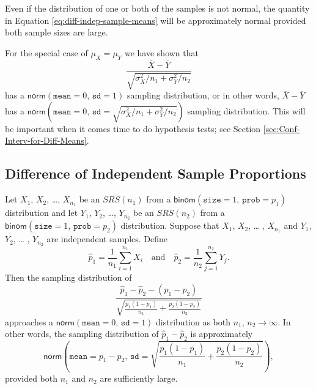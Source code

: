\documentclass[captions=tableheading]{scrbook}
\begin{document}
\begin{rem}
Even if the distribution of one or both of the samples is not normal, the quantity in Equation \ref{eq:diff-indep-sample-means} will be approximately normal provided both sample sizes are large.
\end{rem}

\begin{rem}
For the special case of \(\mu_{X}=\mu_{Y}\) we have shown that 
\begin{equation} \frac{\overline{X}-\overline{Y}}{\sqrt{\sigma_{X}^{2}/n_{1}+\sigma_{Y}^{2}/n_{2}}}
\end{equation}
has a \(\mathsf{norm}(\mathtt{mean}=0,\,\mathtt{sd}=1)\) sampling distribution, or in other words, \(\overline{X}-\overline{Y}\) has a \(\mathsf{norm}(\mathtt{mean}=0,\,\mathtt{sd}=\sqrt{\sigma_{X}^{2}/n_{1}+\sigma_{Y}^{2}/n_{2}})\) sampling distribution. This will be important when it comes time to do hypothesis tests; see Section \ref{sec:Conf-Interv-for-Diff-Means}.
\end{rem}
\subsection{Difference of Independent Sample Proportions}
\label{sec-8-4-2}

\begin{prop}
Let \(X_{1}\), \(X_{2}\), \ldots{}, \(X_{n_{1}}\) be an \(SRS(n_{1})\) from a \(\mathsf{binom}(\mathtt{size}=1,\,\mathtt{prob}=p_{1})\) distribution and let \(Y_{1}\), \(Y_{2}\), \ldots{}, \(Y_{n_{2}}\) be an \(SRS(n_{2})\) from a \(\mathsf{binom}(\mathtt{size}=1,\,\mathtt{prob}=p_{2})\) distribution. Suppose that \(X_{1}\), \(X_{2}\), \ldots{} , \(X_{n_{1}}\) and \(Y_{1}\), \(Y_{2}\), \ldots{} , \(Y_{n_{2}}\) are independent samples. Define 
\begin{equation}
\hat{p}_{1}=\frac{1}{n_{1}}\sum_{i=1}^{n_{1}}X_{i}\quad\mbox{and}\quad\hat{p}_{2}=\frac{1}{n_{2}}\sum_{j=1}^{n_{2}}Y_{j}.
\end{equation}
Then the sampling distribution of
\begin{equation}
\frac{\hat{p}_{1}-\hat{p}_{2}-(p_{1}-p_{2})}{\sqrt{\frac{p_{1}(1-p_{1})}{n_{1}}+\frac{p_{2}(1-p_{2})}{n_{2}}}}
\end{equation}
approaches a \(\mathsf{norm}(\mathtt{mean}=0,\,\mathtt{sd}=1)\) distribution as both \(n_{1},\, n_{2}\to\infty\). In other words, the sampling distribution of \(\hat{p}_{1}-\hat{p}_{2}\) is approximately
\begin{equation}
\mathsf{norm}\left(\mathtt{mean}=p_{1}-p_{2},\,\mathtt{sd}=\sqrt{\frac{p_{1}(1-p_{1})}{n_{1}}+\frac{p_{2}(1-p_{2})}{n_{2}}}\right),
\end{equation}
provided both \(n_{1}\) and \(n_{2}\) are sufficiently large.
\end{prop}
\end{document}
